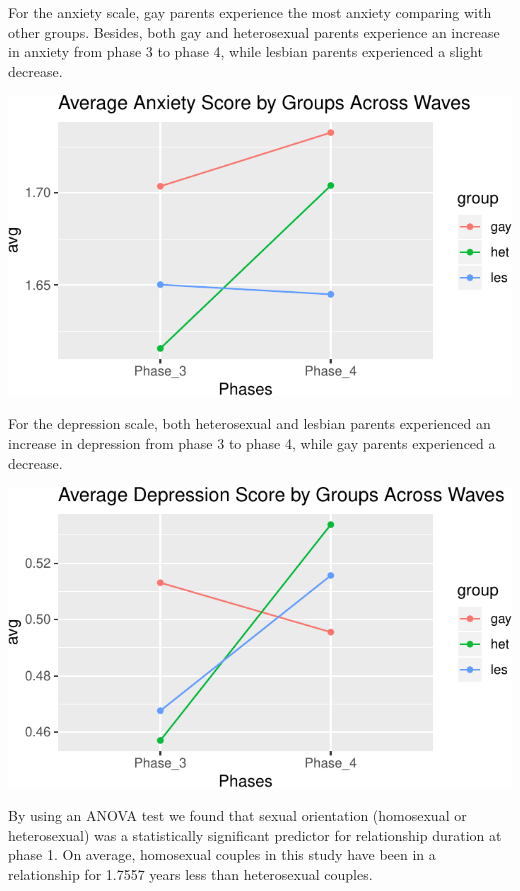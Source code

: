 \documentclass[man]{apa6}
\begin{document}
For the anxiety scale, gay parents experience the most anxiety comparing with other groups. Besides, both gay and heterosexual parents experience an increase in anxiety from phase 3 to phase 4, while lesbian parents experienced a slight decrease.

\includegraphics{measures_descriptive_stats_files/figure-latex/fig3-1.pdf}

For the depression scale, both heterosexual and lesbian parents experienced an increase in depression from phase 3 to phase 4, while gay parents experienced a decrease.

\includegraphics{measures_descriptive_stats_files/figure-latex/fig4-1.pdf}

By using an ANOVA test we found that sexual orientation (homosexual or heterosexual) was a statistically significant predictor for relationship duration at phase 1. On average, homosexual couples in this study have been in a relationship for 1.7557 years less than heterosexual couples.
\end{document}
